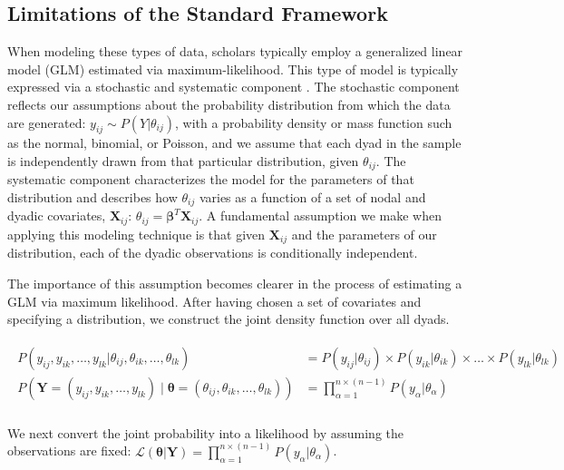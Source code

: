 \subsection{Limitations of the Standard Framework}

When modeling these types of data, scholars typically employ a generalized linear model (GLM) estimated via maximum-likelihood. This type of model is typically expressed via a stochastic and systematic component \citep{pawitan:2013}. The stochastic component reflects our assumptions about the probability distribution from which the data are generated: $y_{ij} \sim P(Y | \theta_{ij})$, with a probability density or mass function such as the normal, binomial, or Poisson, and we assume that each dyad in the sample is independently drawn from that particular distribution, given $\theta_{ij}$. The systematic component characterizes the model for the parameters of that distribution and describes how $\theta_{ij}$ varies as a function of a set of nodal and dyadic covariates, $\mathbf{X}_{ij}$: $\theta_{ij} = \bm\beta^{T} \mathbf{X}_{ij}$. A fundamental assumption we make when applying this modeling technique is that given $\mathbf{X}_{ij}$ and the parameters of our distribution, each of the dyadic observations is conditionally independent. 

The importance of this assumption becomes clearer in the process of estimating a GLM via maximum likelihood. After having chosen a set of covariates and specifying a distribution, we construct the joint density function over all dyads.

\vspace{-8mm}
\begin{align}
\begin{aligned}
	P(y_{ij}, y_{ik}, \ldots, y_{lk} | \theta_{ij}, \theta_{ik}, \ldots, \theta_{lk}) &= P(y_{ij} | \theta_{ij}) \times P(y_{ik} | \theta_{ik}) \times \ldots \times P(y_{lk} | \theta_{lk}) \\
	P(\mathbf{Y}=(y_{ij}, y_{ik}, \ldots, y_{lk}) \; | \; \bm{\theta}=(\theta_{ij}, \theta_{ik}, \ldots, \theta_{lk})) &= \prod_{\alpha=1}^{n \times (n-1)} P(y_{\alpha} | \theta_{\alpha})  \\
\end{aligned}
\end{align}

We next convert the joint probability into a likelihood by assuming the observations are fixed: $\displaystyle \mathcal{L} (\bm{\theta} | \mathbf{Y}) = \prod_{\alpha=1}^{n \times (n-1)} P(y_{\alpha} | \theta_{\alpha})$.

